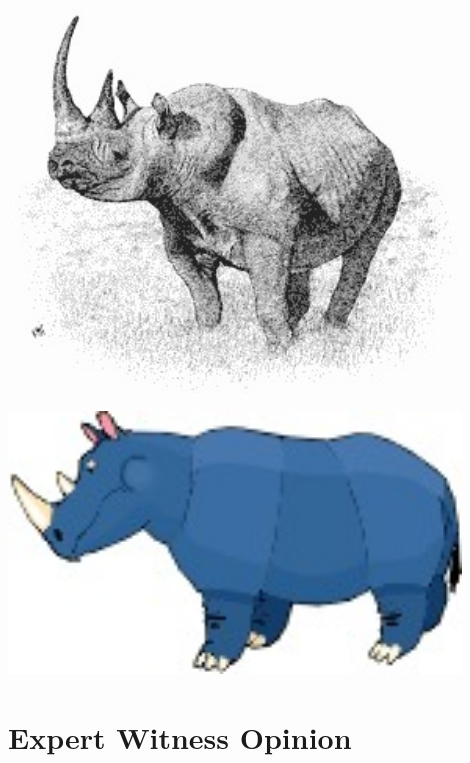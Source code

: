 \documentclass{article}
\begin{document}
\begin{minipage}[h]{0.45\textwidth}
	\centering
	\vspace{0.5cm}
	\includegraphics[width=0.9\textwidth]{img/rhino3.jpg}
	\vspace{1cm}
	\label{fig:rhino3img}
\end{minipage}
\hspace{0.5cm}
\begin{minipage}[h]{0.45\textwidth}
	\centering
	\vspace{0.5cm}
	\includegraphics[width=0.9\textwidth]{img/rhino4.jpg}
	\vspace{1cm}
	\label{fig:rhino4img}
\end{minipage}

\section{Expert Witness Opinion}
\end{document}

